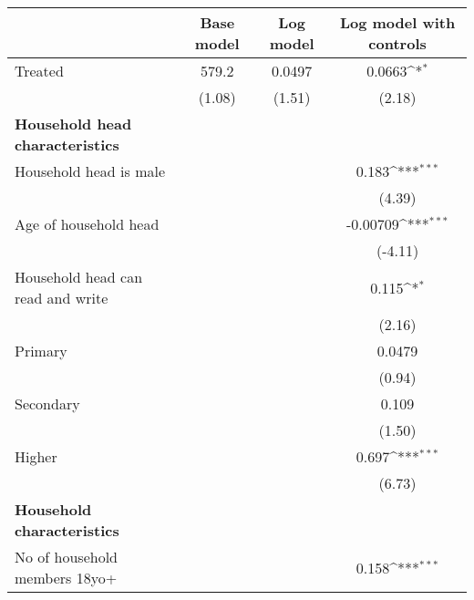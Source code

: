 {
\def\sym#1{\ifmmode^{#1}\else\(^{#1}\)\fi}
\begin{tabular}{l*{3}{c}}
\hline\hline
                    &\multicolumn{1}{c}{Base model}&\multicolumn{1}{c}{Log model}&\multicolumn{1}{c}{Log model with controls}\\
\hline
Treated             &       579.2         &      0.0497         &      0.0663\sym{*}  \\
                    &      (1.08)         &      (1.51)         &      (2.18)         \\
[1em]
\textbf{Household head characteristics}&                     &                     &                     \\
[1em]
Household head is male&                     &                     &       0.183\sym{***}\\
                    &                     &                     &      (4.39)         \\
[1em]
Age of household head&                     &                     &    -0.00709\sym{***}\\
                    &                     &                     &     (-4.11)         \\
[1em]
Household head can read and write&                     &                     &       0.115\sym{*}  \\
                    &                     &                     &      (2.16)         \\
[1em]
Primary             &                     &                     &      0.0479         \\
                    &                     &                     &      (0.94)         \\
[1em]
Secondary           &                     &                     &       0.109         \\
                    &                     &                     &      (1.50)         \\
[1em]
Higher              &                     &                     &       0.697\sym{***}\\
                    &                     &                     &      (6.73)         \\
[1em]
\textbf{Household characteristics}&                     &                     &                     \\
[1em]
No of household members 18yo+&                     &                     &       0.158\sym{***}\\

\end{tabular}}
